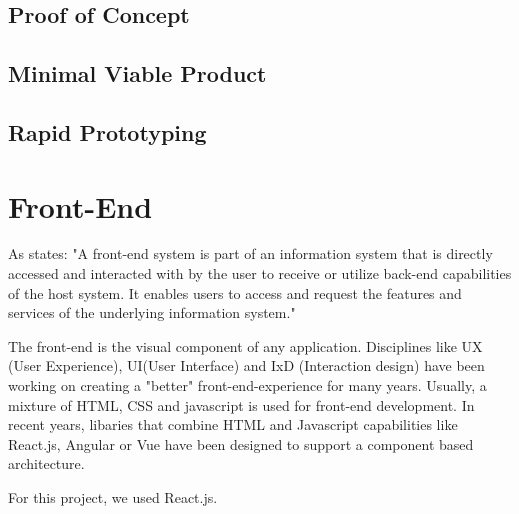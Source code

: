 \subsection{Proof of Concept}
\subsection{Minimal Viable Product}
\subsection{Rapid Prototyping}

\section{Front-End}
As \parencite{frontend} states:
"A front-end system is part of an information system that is directly accessed and interacted with by the user to receive or 
utilize back-end capabilities of the host system. 
It enables users to access and request the features and services of the underlying information system."  

The front-end is the visual component of any application. Disciplines like UX (User Experience), UI(User Interface) and  IxD (Interaction design) have been working on creating 
a "better" front-end-experience for many years. Usually, a mixture of HTML, CSS and javascript is used for front-end development. 
In recent years, libaries that combine HTML and Javascript capabilities like React.js, Angular or Vue %
have been designed to support a component based architecture. 

For this project, we used React.js.

